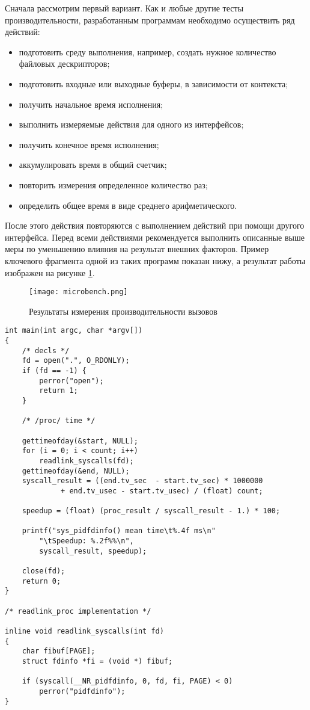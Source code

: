 Сначала рассмотрим первый вариант. Как и любые другие тесты производительности,
разработанным программам необходимо осуществить ряд действий:
\begin{itemize}
\item подготовить среду выполнения, например, создать нужное количество файловых
  дескрипторов;
\item подготовить входные или выходные буферы, в зависимости от контекста;
\item получить начальное время исполнения;
\item выполнить измеряемые действия для одного из интерфейсов;
\item получить конечное время исполнения;
\item аккумулировать время в общий счетчик;
\item повторить измерения определенное количество раз;
\item определить общее время в виде среднего арифметического.
\end{itemize}

После этого действия повторяются с выполнением действий при помощи другого
интерфейса. Перед всеми действиями рекомендуется выполнить описанные выше
меры по уменьшению влияния на результат внешних факторов. Пример ключевого
фрагмента одной из таких программ показан нижу, а результат работы изображен на
рисунке \ref{fig:microbench}.

\begin{figure}
  \centering
  \texttt{[image: microbench.png]}
  \caption{Результаты измерения производительности вызовов}
  \label{fig:microbench}
\end{figure}

\medskip
\begin{lstlisting}[style=cstyle]
int main(int argc, char *argv[])
{
	/* decls */
	fd = open(".", O_RDONLY);
	if (fd == -1) {
		perror("open");
		return 1;
	}

	/* /proc/ time */

	gettimeofday(&start, NULL);
	for (i = 0; i < count; i++)
		readlink_syscalls(fd);
	gettimeofday(&end, NULL);
	syscall_result = ((end.tv_sec  - start.tv_sec) * 1000000
			 + end.tv_usec - start.tv_usec) / (float) count;

	speedup = (float) (proc_result / syscall_result - 1.) * 100;

	printf("sys_pidfdinfo() mean time\t%.4f ms\n"
		"\tSpeedup: %.2f%%\n",
		syscall_result, speedup);

	close(fd);
	return 0;
}

/* readlink_proc implementation */

inline void readlink_syscalls(int fd)
{
	char fibuf[PAGE];
	struct fdinfo *fi = (void *) fibuf;

	if (syscall(__NR_pidfdinfo, 0, fd, fi, PAGE) < 0)
		perror("pidfdinfo");
}
\end{lstlisting}
\medskip

